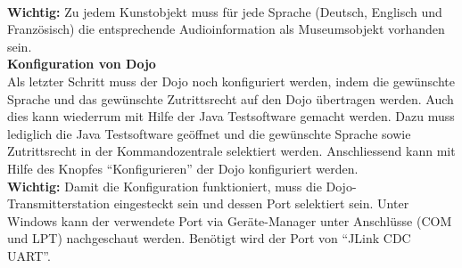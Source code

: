 \\[4mm]
\textbf{Wichtig:} Zu jedem Kunstobjekt muss für jede Sprache (Deutsch, Englisch und Französisch) die entsprechende Audioinformation als Museumsobjekt vorhanden sein.
\\[4mm]
\textbf{Konfiguration von Dojo}
\\[4mm]
Als letzter Schritt muss der Dojo noch konfiguriert werden, indem die gewünschte Sprache und das gewünschte Zutrittsrecht auf den Dojo übertragen werden. Auch dies kann wiederrum mit Hilfe der Java Testsoftware gemacht werden. Dazu muss lediglich die Java Testsoftware geöffnet und die gewünschte Sprache sowie Zutrittsrecht in der Kommandozentrale selektiert werden. Anschliessend kann mit Hilfe des Knopfes ``Konfigurieren'' der Dojo konfiguriert werden.
\\[4mm]
\textbf{Wichtig:} Damit die Konfiguration funktioniert, muss die Dojo-Transmitterstation eingesteckt sein und dessen Port selektiert sein. Unter Windows kann der verwendete Port via Geräte-Manager unter Anschlüsse (COM und LPT) nachgeschaut werden. Benötigt wird der Port von ``JLink CDC UART''.
